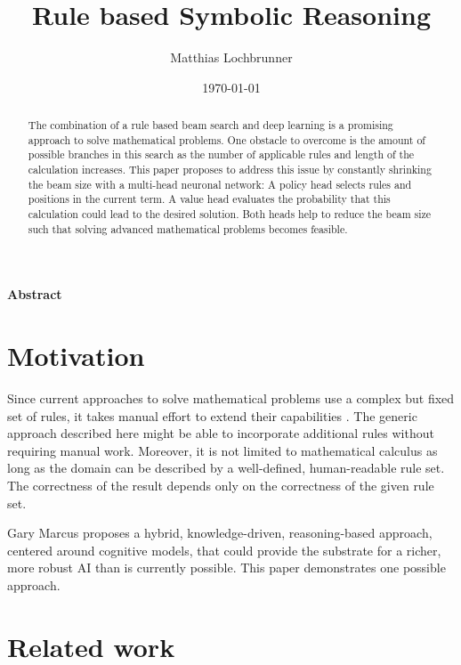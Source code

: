 \documentclass{scrartcl}
\title{Rule based Symbolic Reasoning}
\author{Matthias Lochbrunner}
\date{\today}
\theoremstyle{definition}
\begin{document}
\maketitle
\begin{center}
	\textbf{Abstract}
\end{center}
\begin{abstract}
	The combination of a rule based beam search and deep learning is a promising approach to solve mathematical problems.
	One obstacle to overcome is the amount of possible branches in this search as the number of applicable rules and length of the calculation increases.
	This paper proposes to address this issue by constantly shrinking the beam size with a multi-head neuronal network:
	A policy head selects rules and positions in the current term.
	A value head evaluates the probability that this calculation could lead to the desired solution.
	Both heads help to reduce the beam size such that solving advanced mathematical problems becomes feasible.
\end{abstract}

\section{Motivation}

Since current approaches to solve mathematical problems use a complex but fixed set of rules, it takes manual effort to extend their capabilities \cite{wolfram}.
The generic approach described here might be able to incorporate additional rules without requiring manual work.
Moreover, it is not limited to mathematical calculus as long as the domain can be described by a well-defined, human-readable rule set.
The correctness of the result depends only on the correctness of the given rule set.

Gary Marcus proposes a hybrid, knowledge-driven, reasoning-based approach, centered around cognitive models,
that could provide the substrate for a richer, more robust AI than is currently possible. \cite{marcus2020decade}
This paper demonstrates one possible approach.

\section{Related work}
\end{document}

